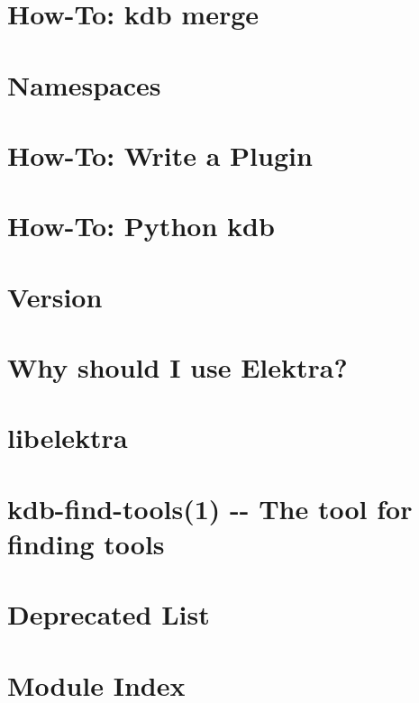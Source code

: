 \documentclass[twoside]{book}
\newcommand{\+}{\discretionary{\mbox{\scriptsize$\hookleftarrow$}}{}{}}
\begin{document}
\chapter{How-\/\+To\+: kdb merge}
\label{doc_tutorials_merge_md}
\hypertarget{doc_tutorials_merge_md}{}

\chapter{Namespaces}
\label{doc_tutorials_namespaces_md}
\hypertarget{doc_tutorials_namespaces_md}{}

\chapter{How-\/\+To\+: Write a Plugin}
\label{doc_tutorials_plugins_md}
\hypertarget{doc_tutorials_plugins_md}{}

\chapter{How-\/\+To\+: Python kdb}
\label{doc_tutorials_python-kdb_md}
\hypertarget{doc_tutorials_python-kdb_md}{}

\chapter{Version}
\label{doc_VERSION_md}
\hypertarget{doc_VERSION_md}{}

\chapter{Why should I use Elektra?}
\label{doc_WHY_md}
\hypertarget{doc_WHY_md}{}

\chapter{libelektra}
\label{README_md}
\hypertarget{README_md}{}

\chapter{kdb-\/find-\/tools(1) -\/-\/ The tool for finding tools}
\label{md_scripts_README}
\hypertarget{md_scripts_README}{}

\chapter{Deprecated List}
\label{deprecated}
\hypertarget{deprecated}{}

\chapter{Module Index}

\end{document}
